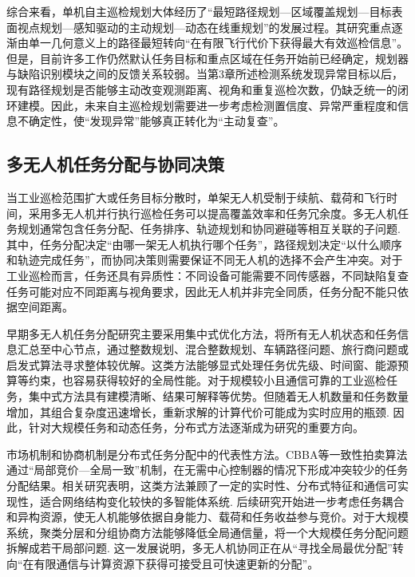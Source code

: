综合来看，单机自主巡检规划大体经历了“最短路径规划—区域覆盖规划—目标表面视点规划—感知驱动的主动规划—动态在线重规划”的发展过程。其研究重点逐渐由单一几何意义上的路径最短转向“在有限飞行代价下获得最大有效巡检信息”。但是，目前许多工作仍然默认任务目标和重点区域在任务开始前已经确定，规划器与缺陷识别模块之间的反馈关系较弱。当第3章所述检测系统发现异常目标以后，现有路径规划是否能够主动改变观测距离、视角和重复巡检次数，仍缺乏统一的闭环建模。因此，未来自主巡检规划需要进一步考虑检测置信度、异常严重程度和信息不确定性，使“发现异常”能够真正转化为“主动复查”。

\subsection{多无人机任务分配与协同决策}

当工业巡检范围扩大或任务目标分散时，单架无人机受制于续航、载荷和飞行时间，采用多无人机并行执行巡检任务可以提高覆盖效率和任务冗余度。多无人机任务规划通常包含任务分配、任务排序、轨迹规划和协同避碰等相互关联的子问题\cite{Skaltsis2023,Chakraa2023}. 其中，任务分配决定“由哪一架无人机执行哪个任务”，路径规划决定“以什么顺序和轨迹完成任务”，而协同决策则需要保证不同无人机的选择不会产生冲突。对于工业巡检而言，任务还具有异质性：不同设备可能需要不同传感器，不同缺陷复查任务可能对应不同距离与视角要求，因此无人机并非完全同质，任务分配不能只依据空间距离。

早期多无人机任务分配研究主要采用集中式优化方法，将所有无人机状态和任务信息汇总至中心节点，通过整数规划、混合整数规划、车辆路径问题、旅行商问题或启发式算法寻求整体较优解。这类方法能够显式处理任务优先级、时间窗、能源预算等约束，也容易获得较好的全局性能。对于规模较小且通信可靠的工业巡检任务，集中式方法具有建模清晰、结果可解释等优势。但随着无人机数量和任务数量增加，其组合复杂度迅速增长，重新求解的计算代价可能成为实时应用的瓶颈\cite{Chakraa2023}. 因此，针对大规模任务和动态任务，分布式方法逐渐成为研究的重要方向。

市场机制和协商机制是分布式任务分配中的代表性方法。CBBA等一致性拍卖算法通过“局部竞价—全局一致”机制，在无需中心控制器的情况下形成冲突较少的任务分配结果。相关研究表明，这类方法兼顾了一定的实时性、分布式特征和通信可实现性，适合网络结构变化较快的多智能体系统\cite{Choi2009,Kim2020}. 后续研究开始进一步考虑任务耦合和异构资源，使无人机能够依据自身能力、载荷和任务收益参与竞价。对于大规模系统，聚类分层和分组协商方法能够降低全局通信量，将一个大规模任务分配问题拆解成若干局部问题\cite{Fu2019,Dong2025}. 这一发展说明，多无人机协同正在从“寻找全局最优分配”转向“在有限通信与计算资源下获得可接受且可快速更新的分配”。

